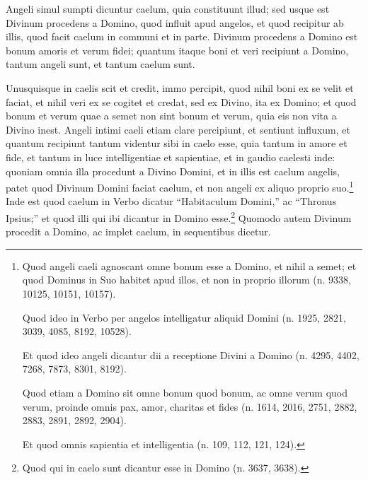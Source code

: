 
\begin{topic}{7}
    Angeli simul sumpti dicuntur caelum, quia constituunt illud; sed usque est Divinum procedens a Domino, quod influit
    apud angelos, et quod recipitur ab illis, quod facit caelum in communi et in parte.
    Divinum procedens a Domino est bonum amoris et verum fidei; quantum itaque boni et veri recipiunt a Domino, tantum
    angeli sunt, et tantum caelum sunt.
\end{topic}

\begin{topic}{8}
    Unusquisque in caelis scit et credit, immo percipit, quod nihil boni ex se velit et faciat, et nihil veri ex se
    cogitet et credat, sed ex Divino, ita ex Domino; et quod bonum et verum quae a semet non sint bonum et verum, quia
    eis non vita a Divino inest.
    Angeli intimi caeli etiam clare percipiunt, et sentiunt influxum, et quantum recipiunt tantum videntur sibi in caelo
    esse, quia tantum in amore et fide, et tantum in luce intelligentiae et sapientiae, et in gaudio caelesti inde:
    quoniam omnia illa procedunt a Divino Domini, et in illis est caelum angelis, patet quod Divinum Domini faciat
    caelum, et non angeli ex aliquo proprio suo.\footnote{Quod angeli caeli agnoscant omne bonum esse a Domino, et nihil
    a semet; et quod Dominus in Suo habitet apud illos, et non in proprio illorum (n. 9338, 10125, 10151, 10157).

    Quod ideo in Verbo per angelos intelligatur aliquid Domini (n. 1925, 2821, 3039, 4085, 8192, 10528).

    Et quod ideo angeli dicantur dii a receptione Divini a Domino (n. 4295, 4402, 7268, 7873, 8301, 8192).

    Quod etiam a Domino sit omne bonum quod bonum, ac omne verum quod verum, proinde omnis pax, amor, charitas et fides
    (n. 1614, 2016, 2751, 2882, 2883, 2891, 2892, 2904).

    Et quod omnis sapientia et intelligentia (n. 109, 112, 121, 124).}
    Inde est quod caelum in Verbo dicatur ``Habitaculum Domini,'' ac ``Thronus Ipsius;'' et quod illi qui ibi dicantur
    in Domino esse.\footnote{Quod qui in caelo sunt dicantur esse in Domino (n. 3637, 3638).}
    Quomodo autem Divinum procedit a Domino, ac implet caelum, in sequentibus dicetur.
\end{topic}

